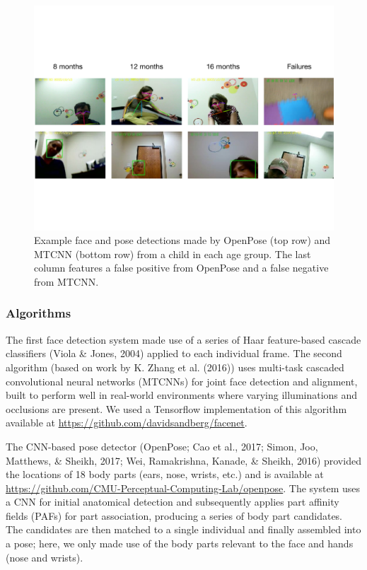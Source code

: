 \documentclass[english,man]{apa6}
\begin{document}
\begin{figure}
\centering
\includegraphics[width=5.5in]{images/detector_samples_banner.pdf}
\caption{\label{fig:frames} Example face and pose detections made by OpenPose (top row) and MTCNN (bottom row) from a child in each age group. The last column features a false positive from OpenPose and a false negative from MTCNN.}
\end{figure}

\subsubsection{Algorithms}\label{algorithms}

The first face detection system made use of a series of Haar
feature-based cascade classifiers (Viola \& Jones, 2004) applied to each
individual frame. The second algorithm (based on work by K. Zhang et al.
(2016)) uses multi-task cascaded convolutional neural networks (MTCNNs)
for joint face detection and alignment, built to perform well in
real-world environments where varying illuminations and occlusions are
present. We used a Tensorflow implementation of this algorithm available
at \url{https://github.com/davidsandberg/facenet}.

The CNN-based pose detector (OpenPose; Cao et al., 2017; Simon, Joo,
Matthews, \& Sheikh, 2017; Wei, Ramakrishna, Kanade, \& Sheikh, 2016)
provided the locations of 18 body parts (ears, nose, wrists, etc.) and
is available at
\url{https://github.com/CMU-Perceptual-Computing-Lab/openpose}. The
system uses a CNN for initial anatomical detection and subsequently
applies part affinity fields (PAFs) for part association, producing a
series of body part candidates. The candidates are then matched to a
single individual and finally assembled into a pose; here, we only made
use of the body parts relevant to the face and hands (nose and wrists).
\end{document}
